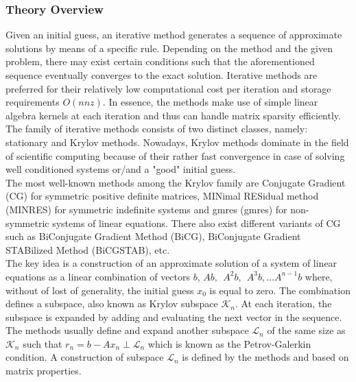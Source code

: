 \subsubsection{Theory Overview}
\label{subseq:iterative-theory}


Given an initial guess, an iterative method generates a sequence of approximate solutions by means of a specific rule. Depending on the method and the given problem, there may exist certain conditions such that the aforementioned sequence eventually converges to the exact solution. Iterative methods are preferred for their relatively low computational cost per iteration and storage requirements $O(nnz)$. In essence, the methods make use of simple linear algebra kernels  at each iteration and thus can handle matrix sparsity efficiently.\\



The family of iterative methods consists of two distinct classes, namely: stationary and Krylov methods. Nowadays, Krylov methods dominate in the field of scientific computing because of their rather fast convergence in case of solving well conditioned systems or/and a "good" initial guess.\\


The most well-known methods among the Krylov family are Conjugate Gradient (CG) for symmetric positive definite matrices, MINimal RESidual method (MINRES) for symmetric indefinite systems and \acrlong{gmres} (\acrshort{gmres}) for non-symmetric systems of linear equations. There also exist different variants of CG such as BiConjugate Gradient Method (BiCG), BiConjugate Gradient STABilized Method (BiCGSTAB), etc.\\


The key idea is a construction of an approximate solution of a system of linear equations as a linear combination of vectors $b$, $Ab, \:\: A^2b, \:\: A^3b, \dots A^{n-1}b$ where, without of lost of generality, the initial guess $x_0$ is equal to zero. The combination defines a subspace, also known as Krylov subspace $\mathcal{K}_{n}$. At each iteration, the subspace is expanded by adding and evaluating the next vector in the sequence. The methods usually define and expand another subspace $\mathcal{L}_{n}$ of the same size as $\mathcal{K}_{n}$ such that $r_{n} = b - Ax_{n} \perp \mathcal{L}_{n}$ which is known as the Petrov-Galerkin condition. A construction of subspace $\mathcal{L}_{n}$ is defined by the methods and based on matrix properties.\\


